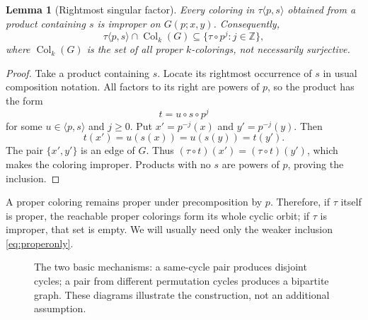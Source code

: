 \documentclass[11pt,a4paper]{article}
\numberwithin{equation}{section}
\newtheorem{lemma}[theorem]{Lemma}
\theoremstyle{definition}
\theoremstyle{remark}
\newcommand{\Z}{\mathbb Z}
\begin{document}
\begin{lemma}[Rightmost singular factor]\label{lem:rightmost}
Every coloring in $\tau\langle p,s\rangle$ obtained from a product containing
$s$ is improper on $G(p;x,y)$. Consequently,
\begin{equation}\label{eq:properonly}
 \tau\langle p,s\rangle\cap\operatorname{Col}_k(G)
 \subseteq\{\tau\circ p^j:j\in\Z\},
\end{equation}
where $\operatorname{Col}_k(G)$ is the set of all proper $k$-colorings,
not necessarily surjective.
\end{lemma}
\begin{proof}
Take a product containing $s$. Locate its rightmost occurrence of $s$ in
usual composition notation. All factors to its right are powers of $p$, so
the product has the form
\[
 t=u\circ s\circ p^j
\]
for some $u\in\langle p,s\rangle$ and $j\ge0$. Put
$x'=p^{-j}(x)$ and $y'=p^{-j}(y)$. Then
\[
 t(x')=u(s(x))=u(s(y))=t(y').
\]
The pair $\{x',y'\}$ is an edge of $G$. Thus
$(\tau\circ t)(x')=(\tau\circ t)(y')$, which makes the coloring improper.
Products with no $s$ are powers of $p$, proving the inclusion.
\end{proof}

A proper coloring remains proper under precomposition by $p$. Therefore, if
$\tau$ itself is proper, the reachable proper colorings form its whole cyclic
orbit; if $\tau$ is improper, that set is empty. We will usually need only
the weaker inclusion \eqref{eq:properonly}.

\begin{figure}[ht]
\centering
{}
\caption{The two basic mechanisms: a same-cycle pair produces disjoint
cycles; a pair from different permutation cycles produces a bipartite graph.
These diagrams illustrate the construction, not an additional assumption.}
\label{fig:graphs}
\end{figure}
\end{document}

